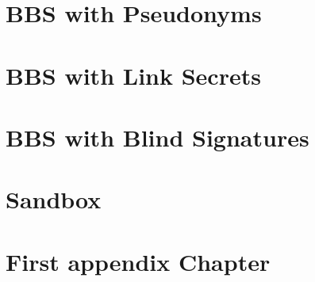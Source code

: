 \documentclass[
	a4paper               %
	,BCOR=0mm            %
	,bibliography=totoc   %
	,listof=totoc         %
	,monolingual
	,twoside=false
]{bfhthesis}              %
\begin{document}
\chapter{BBS with Pseudonyms}
\label{chap:Pseudonyms}

\chapter{BBS with Link Secrets}
\label{chap:linksecrets}

\chapter{BBS with Blind Signatures}
\label{chap:blindsignatures}


\chapter{Sandbox}

\appendix


\chapter{First appendix Chapter}



\end{document}
